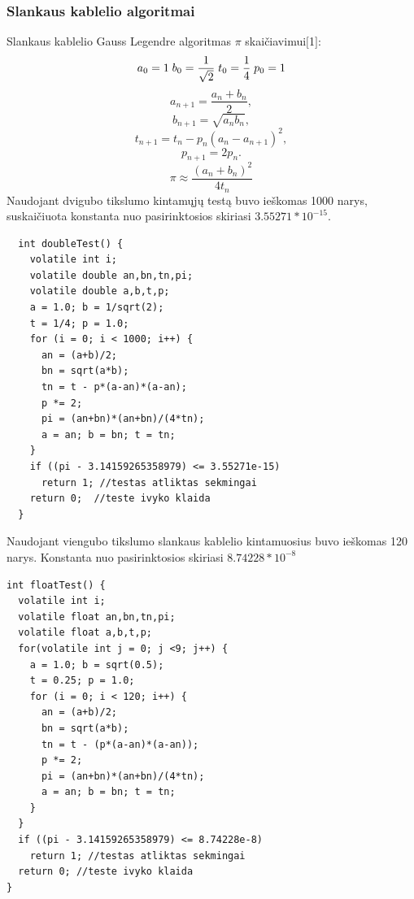\documentclass[a4paper, 12pt]{article} %
\begin{document}
\begin{onehalfspacing}
\subsubsection{Slankaus kablelio algoritmai}
Slankaus kablelio Gauss Legendre algoritmas $\pi$ skai\v{c}iavimui$[$1$]$:
\begin{equation*}\label{xx}
a_{0}=1\;b_{0}=\frac{1}{\sqrt{2}}\;t_{0}=\frac{1}{4}\;p_{0}=1\\
\end{equation*}
\begin{equation*}
a_{n+1} = \frac{a_n + b_n}{2},
\end{equation*}
\begin{equation*}
b_{n+1} = \sqrt{a_n b_n}, 
\end{equation*}
\begin{equation*}
t_{n+1} = t_n - p_n(a_n - a_{n+1})^2, 
\end{equation*}
\begin{equation*}
p_{n+1} = 2p_n. 
\end{equation*}
\begin{equation}
\pi \approx \frac{(a_n+b_n)^2}{4t_n}
\end{equation}
Naudojant dvigubo tikslumo kintam\k{u}j\k{u} test\k{a} buvo ie\v{s}komas 1000 narys, suskai\v{c}iuota  
konstanta nuo pasirinktosios skiriasi $3.55271 * 10^{-15}$. 
\begin{verbatim}
  int doubleTest() { 
    volatile int i; 
    volatile double an,bn,tn,pi; 
    volatile double a,b,t,p;  
    a = 1.0; b = 1/sqrt(2); 
    t = 1/4; p = 1.0; 
    for (i = 0; i < 1000; i++) { 
      an = (a+b)/2;  
      bn = sqrt(a*b); 
      tn = t - p*(a-an)*(a-an);  
      p *= 2; 
      pi = (an+bn)*(an+bn)/(4*tn);  
      a = an; b = bn; t = tn; 
    }
    if ((pi - 3.14159265358979) <= 3.55271e-15) 
      return 1; //testas atliktas sekmingai
    return 0;  //teste ivyko klaida
  } 
\end{verbatim}
Naudojant viengubo tikslumo slankaus kablelio kintamuosius buvo ie\v{s}komas 120 narys. Konstanta nuo pasirinktosios skiriasi $8.74228* 10^{-8}$
\begin{verbatim}
int floatTest() {
  volatile int i;
  volatile float an,bn,tn,pi;
  volatile float a,b,t,p;
  for(volatile int j = 0; j <9; j++) {
    a = 1.0; b = sqrt(0.5);
    t = 0.25; p = 1.0;
    for (i = 0; i < 120; i++) {
      an = (a+b)/2;
      bn = sqrt(a*b);
      tn = t - (p*(a-an)*(a-an));
      p *= 2;
      pi = (an+bn)*(an+bn)/(4*tn);
      a = an; b = bn; t = tn;
    } 
  }
  if ((pi - 3.14159265358979) <= 8.74228e-8)
    return 1; //testas atliktas sekmingai
  return 0; //teste ivyko klaida
}
\end{verbatim}

\end{onehalfspacing}
\end{document}
